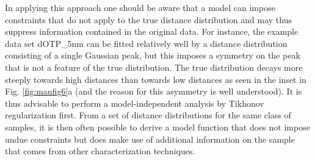 \documentclass{article}
\begin{document}
In applying this approach one should be aware that a model can impose constraints that do not apply to the true distance distribution and may thus suppress information contained in the original data. For instance, the example data set {\ttfamily dOTP\_5nm} can be fitted relatively well by a distance distribution consisting of a single Gaussian peak, but this imposes a symmetry on the peak that is not a feature of the true distribution. The true distribution decays more steeply towards high distances than towards low distances as seen in the inset in Fig. \ref{fig:manfig6}a (and the reason for this asymmetry is well understood). It is thus advisable to perform a model-independent analysis by Tikhonov regularization first. From a set of distance distributions for the same class of samples, it is then often possible to derive a model function that does not impose undue constraints but does make use of additional information on the sample that comes from other characterization techniques.
\end{document}
